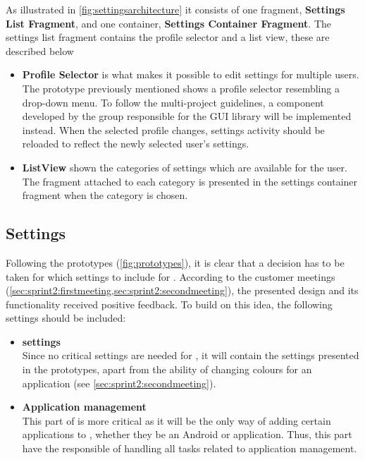 As illustrated in \cref{fig:settingsarchitecture} it consists of one fragment, \textbf{Settings List Fragment}, and one container, \textbf{Settings Container Fragment}.
The settings list fragment contains the profile selector and a list view, these are described below
\begin{itemize}
\item \textbf{Profile Selector} is what makes it possible to edit settings for multiple users.
The prototype previously mentioned shows a profile selector resembling a drop-down menu.
To follow the multi-project guidelines, a component developed by the group responsible for the GUI library will be implemented instead.
When the selected profile changes, settings activity should be reloaded to reflect the newly selected user's settings.
\item \textbf{ListView} shown the categories of settings which are available for the user.
The fragment attached to each category is presented in the settings container fragment when the category is chosen.
\end{itemize}

\subsection{\launcher Settings}\label{sec:launchersettings}
Following the prototypes (\cref{fig:prototypes}), it is clear that a decision has to be taken for which settings to include for \launcher.
According to the customer meetings (\cref{sec:sprint2:firstmeeting,sec:sprint2:secondmeeting}), the presented design and its functionality received positive feedback.
To build on this idea, the following settings should be included:

\begin{itemize}
\item \textbf{\launcher settings}\\
Since no critical settings are needed for \launcher, it will contain the settings presented in the prototypes, apart from the ability of changing colours for an application (see \cref{sec:sprint2:secondmeeting}).
\item \textbf{Application management}\\
This part of \launcher is more critical as it will be the only way of adding certain applications to \launcher, whether they be an Android or \giraf application.
Thus, this part have the responsible of handling all tasks related to application management.
\end{itemize}

















